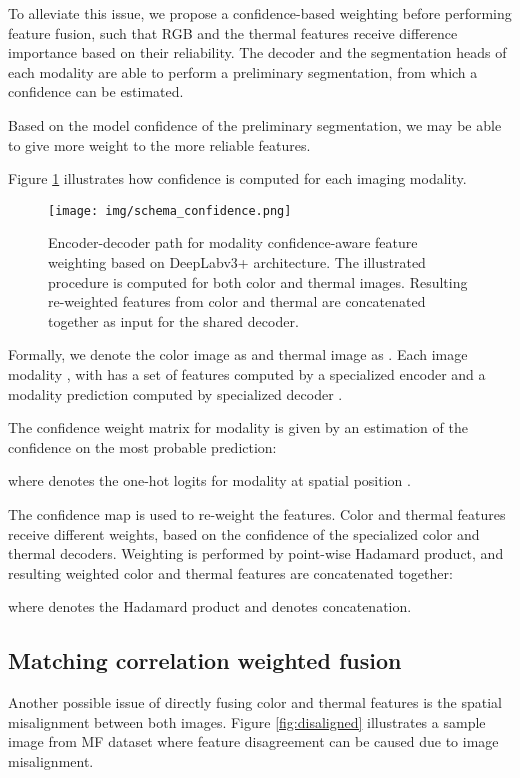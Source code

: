 \documentclass[10pt,twocolumn,letterpaper]{article}
\begin{document}
To alleviate this issue, we propose a confidence-based weighting before performing feature fusion, such that RGB and the thermal features receive difference importance based on their reliability. The decoder and the segmentation heads of each modality are able to perform a preliminary segmentation, from which a confidence can be estimated.

Based on the model confidence of the preliminary segmentation, we may be able to give more weight to the more reliable features.

Figure \ref{fig:confidence} illustrates how confidence is computed for each imaging modality.

\begin{figure}[t]
\texttt{[image: img/schema\_confidence.png]}
\centering
\caption{Encoder-decoder path for modality confidence-aware feature weighting based on DeepLabv3+ architecture. The illustrated procedure is computed for both color and thermal images. Resulting re-weighted features from color and thermal are concatenated together as input for the shared decoder.}
\label{fig:confidence}
\end{figure}

Formally, we denote the color image as  and thermal image as . Each image modality , with   has a set of features computed by a specialized encoder  and a modality prediction computed by specialized decoder .

The confidence weight matrix  for modality  is given by an estimation of the confidence on the most probable prediction:


where  denotes the one-hot logits for modality  at spatial position .

The confidence map  is used to re-weight the features.
Color and thermal features receive different weights, based on the confidence of the specialized color and thermal decoders. 
Weighting is performed by point-wise Hadamard product, and resulting weighted color and thermal features are concatenated together:

where  denotes the Hadamard product and  denotes concatenation. 

\subsection{Matching correlation weighted fusion}

Another possible issue of directly fusing color and thermal features is the spatial misalignment between both images. Figure \ref{fig:disaligned} illustrates a sample image from MF dataset \cite{Ha2017} where feature disagreement can be caused due to image misalignment.
\end{document}

